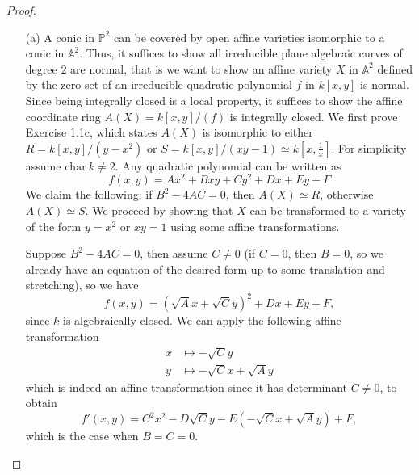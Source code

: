 \documentclass[12pt]{article}
\newcommand{\A}{\mathbb{A}}
\newcommand{\PP}{\mathbb{P}}
\theoremstyle{definition}
\begin{document}
\begin{enumerate} [label=\textbf{\arabic*.}, leftmargin=-0.05em]
\begin{proof} $ $ \vspace{0pt}
   \begin{itemize}
    \item[(a)] A conic in $\PP^2$ can be covered by open affine varieties isomorphic to a conic in $\A^2$. Thus, it suffices to show all irreducible plane algebraic curves of degree $2$ are normal, that is we want to show an affine variety $X$ in $\A^2$ defined by the zero set of an irreducible quadratic polynomial $f$ in $k[x, y]$ is normal. Since being integrally closed is a local property, it suffices to show the affine coordinate ring $A(X) = k[x, y] / (f)$ is integrally closed. We first prove Exercise 1.1c, which states $A(X)$ is isomorphic to either $R = k[x, y] / (y - x^2)$ or $S = k[x, y] / (xy - 1) \simeq k[x, \frac{1}{x}]$. For simplicity assume $\text{char}~k \neq 2$. Any quadratic polynomial can be written as
    \begin{equation*}
        f(x, y)  = Ax^2 + Bxy + Cy^2 + Dx + Ey + F
    \end{equation*}
    We claim the following: if $B^2 - 4AC = 0$, then $A(X) \simeq R$, otherwise $A(X) \simeq S$. We proceed by showing that $X$ can be transformed to a variety of the form $y = x^2$ or $xy = 1$ using some affine transformations.

    Suppose $B^2 - 4AC = 0$, then assume $C \neq 0$ (if $C = 0$, then $B = 0$, so we already have an equation of the desired form up to some translation and stretching), so we have
    \begin{equation*}
        f(x, y) = (\sqrt{A}x + \sqrt{C}y)^2 + Dx + Ey + F,
    \end{equation*}
    since $k$ is algebraically closed. We can apply the following affine transformation
    \begin{align*}
        x & \mapsto -\sqrt{C} y\\
        y & \mapsto -\sqrt{C} x + \sqrt{A}y
    \end{align*}
    which is indeed an affine transformation since it has determinant $C \neq 0$, to obtain
    \begin{equation*}
        f'(x, y) = C^2 x^2 - D\sqrt{C}y - E(-\sqrt{C}x + \sqrt{A}y) + F,
    \end{equation*}
    which is the case when $B = C = 0$. 


\end{itemize}
\end{proof}
\end{enumerate}
\end{document}
